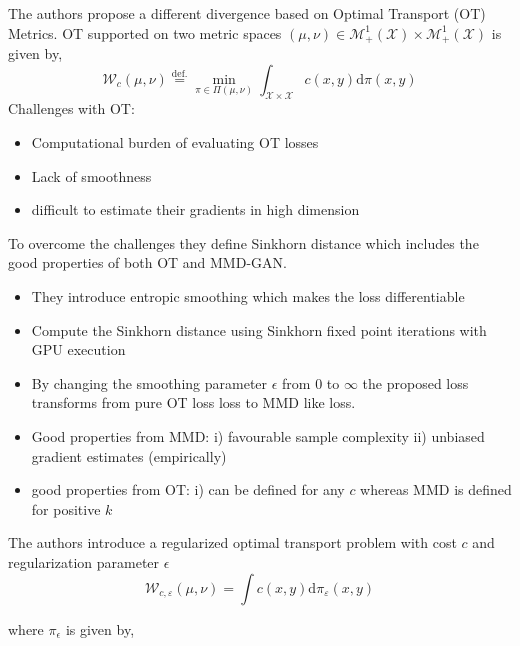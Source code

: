 The authors propose a different divergence based on Optimal Transport (OT) Metrics. OT supported on two metric spaces $(\mu, \nu) \in \mathcal{M}_{+}^{1}(\mathcal{X}) \times \mathcal{M}_{+}^{1}(\mathcal{X})$ is given by,
   $$
\mathcal{W}_{c}(\mu, \nu) \stackrel{\mathrm{def.}}{=} \min _{\pi \in \Pi(\mu, \nu)} \int_{\mathcal{X} \times \mathcal{X}} c(x, y) \mathrm{d} \pi(x, y)
$$
Challenges with OT:
    \begin{itemize}
        \item Computational burden of evaluating OT losses
        \item Lack of smoothness
        \item difficult to estimate their gradients in high dimension
    \end{itemize}{}
To overcome the challenges they define Sinkhorn distance which includes the good properties of both OT and MMD-GAN.
\begin{itemize}
    \item They introduce entropic smoothing which makes the loss differentiable
\item Compute the Sinkhorn distance using Sinkhorn fixed point iterations with GPU execution
\item By changing the smoothing parameter $\epsilon$ from $0$ to $\infty$ the proposed loss transforms from pure OT loss loss to MMD like loss. 
\item Good properties from MMD: i) favourable sample complexity
ii) unbiased gradient estimates (empirically)
\item good properties from OT: i) can be defined for any $c$ whereas MMD is defined for positive $k$
\end{itemize}
\noindent The authors introduce a regularized optimal transport problem
with cost $c$ and regularization parameter $\epsilon$
\begin{equation}
\mathcal{W}_{c, \varepsilon}(\mu, \nu)=\int c(x, y) \mathrm{d} \pi_{\varepsilon}(x, y)
\end{equation}

where $\pi_{\epsilon}$ is given by,

